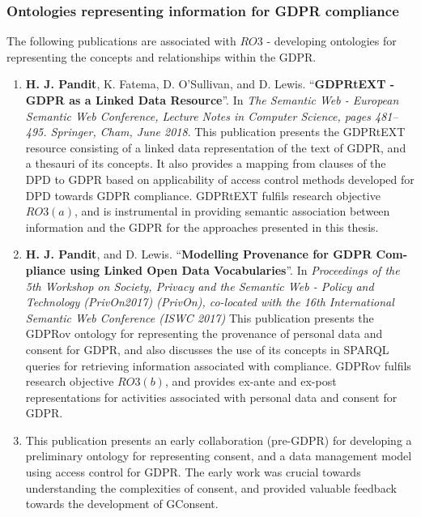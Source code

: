 \subsubsection{Ontologies representing information for GDPR compliance}
The following publications are associated with $RO3$ - developing ontologies for representing the concepts and relationships within the GDPR.
\begin{enumerate}[start]
    \item \textbf{H. J. Pandit}, K. Fatema, D. O’Sullivan, and D. Lewis. ``\textbf{GDPRtEXT - GDPR as a Linked Data Resource}''. In \textit{The Semantic Web - European Semantic Web Conference, Lecture Notes in Computer Science, pages 481–495. Springer, Cham, June 2018}. \cite{pandit_gdprtext_2018}
        \newline
        This publication presents the GDPRtEXT resource consisting of a linked data representation of the text of GDPR, and a thesauri of its concepts. It also provides a mapping from clauses of the DPD to GDPR based on applicability of access control methods developed for DPD towards GDPR compliance. GDPRtEXT fulfils research objective $RO3(a)$, and is instrumental in providing semantic association between information and the GDPR for the approaches presented in this thesis.
    \item \textbf{H. J. Pandit}, and D. Lewis. ``\textbf{Modelling Provenance for GDPR Com- pliance using Linked Open Data Vocabularies}''. In \textit{Proceedings of the 5th Workshop on Society, Privacy and the Semantic Web - Policy and Technology (PrivOn2017) (PrivOn), co-located with the 16th International Semantic Web Conference (ISWC 2017)} \cite{pandit_modelling_2017}
        \newline
        This publication presents the GDPRov ontology for representing the provenance of personal data and consent for GDPR, and also discusses the use of its concepts in SPARQL queries for retrieving information associated with compliance. GDPRov fulfils research objective $RO3(b)$, and provides ex-ante and ex-post representations for activities associated with personal data and consent for GDPR.
    \item {}
        \newline
        This publication presents an early collaboration (pre-GDPR) for developing a preliminary ontology for representing consent, and a data management model using access control for GDPR. The early work was crucial towards understanding the complexities of consent, and provided valuable feedback towards the development of GConsent.

\end{enumerate}
